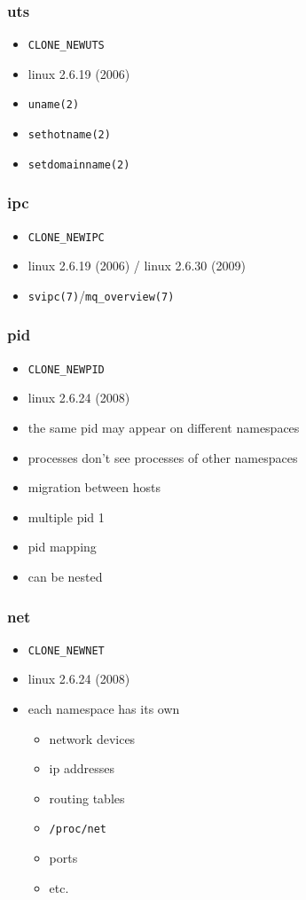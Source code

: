 \documentclass{beamer}
\begin{document}
\begin{frame}
    \frametitle{uts}
    \begin{itemize}
        \item \texttt{CLONE\_NEWUTS}
        \item linux 2.6.19 (2006)
        \item \texttt{uname(2)}
        \item \texttt{sethotname(2)}
        \item \texttt{setdomainname(2)}
    \end{itemize}
\end{frame}

\begin{frame}
    \frametitle{ipc}
    \begin{itemize}
        \item \texttt{CLONE\_NEWIPC}
        \item linux 2.6.19 (2006) / linux 2.6.30 (2009)
        \item \texttt{svipc(7)}/\texttt{mq\_overview(7)}
    \end{itemize}
\end{frame}

\begin{frame}
    \frametitle{pid}
    \begin{itemize}
        \item \texttt{CLONE\_NEWPID}
        \item linux 2.6.24 (2008)
        \item the same pid may appear on different namespaces
        \item processes don't see processes of other namespaces
        \item migration between hosts
        \item multiple pid 1
        \item pid mapping
        \item can be nested
    \end{itemize}
\end{frame}

\begin{frame}
    \frametitle{net}
    \begin{itemize}
        \item \texttt{CLONE\_NEWNET}
        \item linux 2.6.24 (2008)
        \item each namespace has its own
            \begin{itemize}
                \item network devices
                \item ip addresses
                \item routing tables
                \item \texttt{/proc/net}
                \item ports
                \item etc.
            \end{itemize}
    \end{itemize}
\end{frame}
\end{document}
